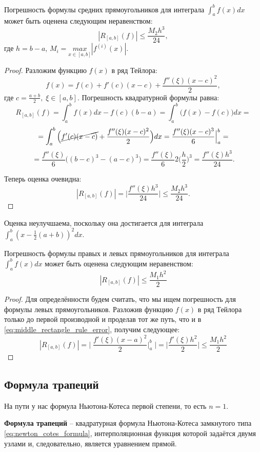 \documentclass[../main.tex]{subfile}
\begin{document}
\begin{theorem}
\label{eq:middle_rectangle_rule_error}
	Погрешность формулы средних прямоугольников для интеграла $\int_a^b
	f(x)dx$ может быть оценена следующим неравенством:
	\[\boxed{|R_{[a,b]}(f)|\le\frac{M_2h^3}{24}},\]
	где $h=b-a$, $M_i=\underset{x\in[a,b]}{max}|f^{(i)}(x)|.$
\end{theorem}

\begin{proof}
	Разложим функцию $f(x)$ в ряд Тейлора:
	\[f(x)=f(c)+f'(c)(x-c)+\frac{f''(\xi)(x-c)^2}{2},\]
	где $c=\frac{a+b}{2},\;\xi\in[a,b].$ Погрешность квадратурной формулы
	равна:
	\[R_{[a,b]}(f)=\int_a^b f(x)dx - f(c)(b-a)=\int_a^b\big(f(x) - f(c)\big)
	dx=\]
	\[=\int_a^b \Big(\cancel{f'(c)(x-c)}+\frac{f''(\xi)(x-c)^2}{2}\Big)dx=
	\frac{f''(\xi)(x-c)^3}{6}\Big|_a^b=\]
	\[=\frac{f''(\xi)}{6}\Big((b-c)^3-(a-c)^3\Big)=\frac{f''(\xi)}{6}2\Big(
	\frac{h}{2}\Big)^3=\frac{f''(\xi)h^3}{24}.\]

	Теперь оценка очевидна:
	\[|R_{[a,b]}(f)|=\Big|\frac{f''(\xi)h^3}{24}\Big|\le\frac{M_2h^3}{24}.\]
\end{proof}

Оценка неулучшаема, поскольку она достигается для интеграла\\
$\int_a^b(x-\frac{1}{2}(a+b))^2dx$.

\begin{theorem}
	Погрешность формулы правых и левых прямоугольников для интеграла
	$\int_a^b f(x)dx$ может быть оценена следующим неравенством:
	\[\boxed{|R_{[a,b]}(f)|\le\frac{M_1h^2}{2}}\]
\end{theorem}

\begin{proof}
	Для определённости будем считать, что мы ищем погрешность для формулы
	левых прямоугольников. Разложив функцию $f(x)$ в ряд Тейлора только до
	первой производной и проделав тот же путь, что и в
	\eqref{eq:middle_rectangle_rule_error}, получим следующее:
	\[|R_{[a,b]}(f)|=\Big|\;\frac{f'(\xi)(x-a)^2}{2}\Big|_a^b\;\Big|=
	\Big|\frac{f'(\xi)h^2}{2}\Big|\le\frac{M_1h^2}{2}\]
\end{proof}

\subsection{Формула трапеций}
На пути у нас формула Ньютона-Котеса первой степени, то есть $n=1$.

\begin{define}
	\textbf{Формула трапеций} -- квадратурная формула Ньютона-Котеса
	замкнутого типа \eqref{eq:newton_cotes_formula}, интерполяционная
	функция которой задаётся двумя узлами и, следовательно, является
	уравнением прямой.
\end{define}
\end{document}
